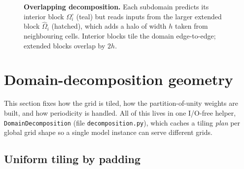 \documentclass[11pt]{article}
\newcommand{\code}[1]{\texttt{#1}}
\begin{document}
\begin{figure}[t]
\centering
{}
\caption{\textbf{Overlapping decomposition.} Each subdomain predicts its interior
block $\Omega_i^\circ$ (teal) but reads inputs from the larger extended block
$\hat\Omega_i$ (hatched), which adds a halo of width $h$ taken from neighbouring
cells. Interior blocks tile the domain edge-to-edge; extended blocks overlap by
$2h$.}
\label{fig:decomp}
\end{figure}

\section{Domain-decomposition geometry}\label{sec:geometry}

This section fixes how the grid is tiled, how the partition-of-unity weights are
built, and how periodicity is handled. All of this lives in one I/O-free helper,
\code{DomainDecomposition} (file \code{decomposition.py}), which caches a tiling
\emph{plan} per global grid shape so a single model instance can serve different
grids.

\subsection{Uniform tiling by padding}\label{sec:tiling}
\end{document}
